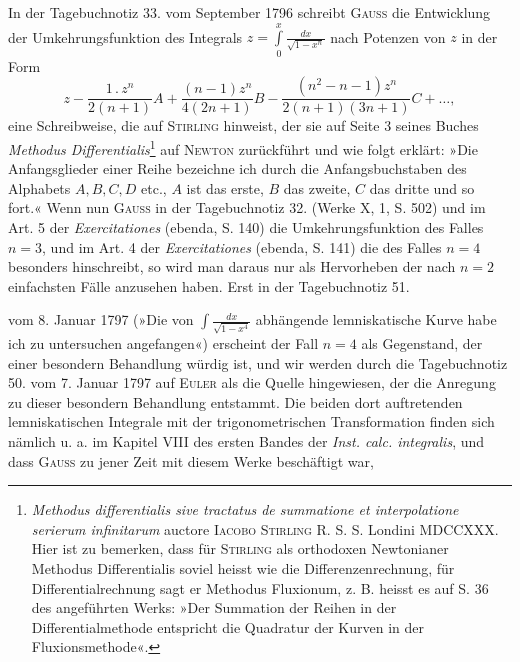 \bigskip
\begin{center}\end{center}
\indent In der Tagebuchnotiz 33. vom September 1796 schreibt \textsc{Gauss} die Entwicklung
der Umkehrungsfunktion des Integrals \(z=\displaystyle\int\limits_0^x\frac{dx}{\sqrt{1-x^n}}\) nach Potenzen
von \(z\) in der Form
\[
z-\frac{1\,.\,z^n}{2(n+1)}A+\frac{(n-1)z^n}{4(2n+1)}B
-\frac{(n^2-n-1)z^n}{2(n+1)(3n+1)}C+\ldots,
\]
eine Schreibweise, die auf \textsc{Stirling} hinweist, der sie auf Seite 3 seines Buches
\textit{Methodus Differentialis}\footnote{\textit{Methodus differentialis sive tractatus de summatione et interpolatione serierum infinitarum} auctore \textsc{Iacobo Stirling} R. S. S. Londini MDCCXXX. Hier ist zu bemerken, dass für \textsc{Stirling} als orthodoxen Newtonianer Methodus Differentialis soviel heisst wie die Differenzenrechnung, für Differentialrechnung sagt er Methodus Fluxionum, z. B. heisst es auf S. 36 des angeführten Werks: »Der Summation der Reihen in der Differentialmethode entspricht die Quadratur der Kurven in der Fluxionsmethode«.}
auf \textsc{Newton} zurückführt und wie folgt erklärt: »Die
Anfangsglieder einer Reihe bezeichne ich durch die Anfangsbuchstaben des
Alphabets \(A,B,C,D\) etc., \(A\) ist das erste, \(B\) das zweite, \(C\) das dritte und
so fort.« Wenn nun \textsc{Gauss} in der Tagebuchnotiz 32. (Werke X, 1, S. 502)
und im Art. 5 der \textit{Exercitationes} (ebenda, S. 140) die Umkehrungsfunktion des
Falles \(n=3\), und im Art. 4 der \textit{Exercitationes} (ebenda, S. 141) die des Falles
\(n=4\) besonders hinschreibt, so wird man daraus nur als Hervorheben der nach
\(n=2\) einfachsten Fälle anzusehen haben. Erst in der Tagebuchnotiz 51.\par
\clearpage{}
\noindent vom 8. Januar 1797 (»Die von \(\displaystyle\int\frac{dx}{\sqrt{1-x^4}}\) abhängende lemniskatische Kurve habe
ich zu untersuchen angefangen«) erscheint der Fall \(n=4\) als Gegenstand, der
einer besondern Behandlung würdig ist, und wir werden durch die Tagebuchnotiz
50. vom 7. Januar 1797 auf \textsc{Euler} als die Quelle hingewiesen, der die
Anregung zu dieser besondern Behandlung entstammt. Die beiden dort auftretenden
lemniskatischen Integrale mit der trigonometrischen Transformation
finden sich nämlich u. a. im Kapitel VIII des ersten Bandes der \textit{Inst. calc.
integralis}, und dass \textsc{Gauss} zu jener Zeit mit diesem Werke beschäftigt war,
